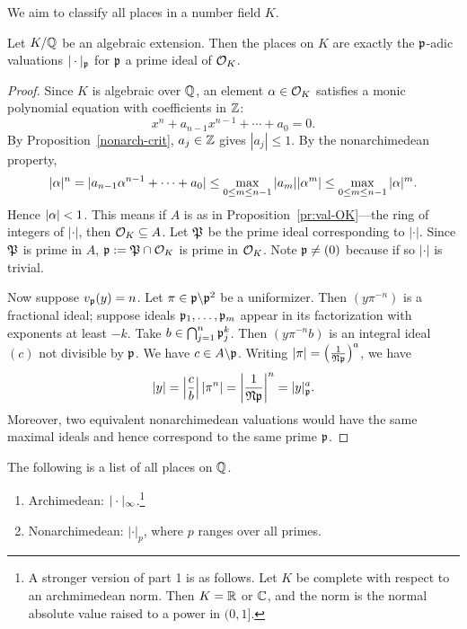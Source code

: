 We aim to classify all places in a number field $K$. %
\begin{pr}
Let $K/\mathbb{Q}$ be an algebraic extension. Then the places on $K$ are exactly the $\mathfrak{p}$-adic valuations $|\cdot|_{\mathfrak{p}}$ for $\mathfrak{p}$ a prime ideal of $\mathcal{O}_K$. %
\end{pr}
\begin{proof}
Since $K$ is algebraic over $\mathbb{Q}$, an element $\alpha\in \mathcal{O}_K$ satisfies a monic polynomial equation with coefficients in $\mathbb{Z}$:
\[
x^n+a_{n-1}x^{n-1}+\cdots +a_0=0.
\]
By Proposition~\ref{nonarch-crit}, $a_j\in \mathbb{Z}$ gives $|a_j|\le 1$.
By the nonarchimedean property,
\[|\alpha|^n=|a_{n-1}\alpha^{n-1}+\cdots +a_0|\le \max_{0\le m\le n-1}|a_{m}||\alpha^{m}|\le \max_{0\le m\le n-1}|\alpha|^m.\]
Hence $|\alpha|<1$. This means if $A$ is as in Proposition~\ref{pr:val-OK}---the ring of integers of $|\cdot|$, then $\mathcal{O}_K\subseteq A$. Let $\mathfrak{P}$ be the prime ideal corresponding to $|\cdot|$. Since $\mathfrak{P}$ is prime in $A$, $\mathfrak{p}:=\mathfrak{P}\cap \mathcal{O}_K$ is prime in $\mathcal{O}_K$. Note $\mathfrak{p}\ne (0)$ because if so $|\cdot|$ is trivial.

Now suppose $v_{\mathfrak{p}}(y)=n$. Let $\pi\in \mathfrak{p}\backslash \mathfrak{p}^2$ be a uniformizer. Then $(y\pi^{-n})$ is a fractional ideal; suppose ideals $\mathfrak{p}_1,\ldots, \mathfrak{p}_m$ appear in its factorization with exponents at least $-k$. Take $b\in \bigcap_{j=1}^n \mathfrak{p}_j^k$. Then $(y\pi^{-n}b)$ is an integral ideal $(c)$ not divisible by $\mathfrak{p}$. We have $c\in A\backslash \mathfrak{p}$. Writing $|\pi|=\left( {\frac{1}{\mathfrak N\mathfrak{p}}} \right)^a$, we have
\[
|y|=\left| {\frac{c}{b}} \right|\left| {\pi^n} \right|=\left| {\frac{1}{\mathfrak N \mathfrak{p}}} \right|^n=|y|_{\mathfrak{p}}^a.
\]
Moreover, two equivalent nonarchimedean valuations would have the same maximal ideals and hence correspond to the same prime $\mathfrak{p}$.
\end{proof}
\begin{thm}[Ostrowski]
The following is a list of all places on $\mathbb{Q}$.
\begin{enumerate}
\item
Archimedean: $|\cdot |_{\infty}$.\footnote{A stronger version of part 1 is as follows. Let $K$ be complete with respect to an archmimedean norm. Then $K=\mathbb{R}$ or $\mathbb{C}$, and the norm is the normal absolute value raised to a power in $(0,1]$.}
\item
Nonarchimedean: $|\cdot|_p$, where $p$ ranges over all primes.
\end{enumerate}
\end{thm}
